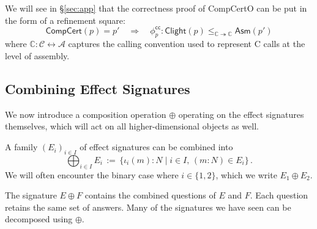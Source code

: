 \documentclass[acmsmall,screen,review,nonacm]{acmart}
\newcommand{\kw}[1]{\ensuremath{ \mathsf{#1} }}
\begin{document}
\begin{example} %
\label{ex:bq-proof}
We will see in \S\ref{sec:app}
that the correctness proof of CompCertO
can be put in the form of a refinement square:
\[
  \kw{CompCert}(p) = p'
  \quad \Longrightarrow \quad
    \phi^\kw{cc}_p :
      \kw{Clight}(p) \le_{\mathbb{C} \twoheadrightarrow \mathbb{C}} \kw{Asm}(p')
\]
where %
$\mathbb{C} : \mathcal{C} \leftrightarrow \mathcal{A}$
captures the calling convention used %
to represent C calls at the level of assembly.
\end{example}



\subsection{Combining Effect Signatures} \label{sec:fcomp} %

We now introduce
a composition operation $\oplus$ operating on the effect signatures themselves,
which will act on all higher-dimensional objects as well.

\begin{definition}
A family $(E_i)_{i \in I}$ of effect signatures can be combined into
\[
  \bigoplus_{i \in I} E_i \, := \,
    \{ \iota_i(m) \mathbin: N \mid i \in I,\, (m \mathbin: N) \in E_i \}
  \,.
\]
We will often encounter the binary case where $i \in \{1, 2\}$,
which we write $E_1 \oplus E_2$.
\end{definition}

The signature $E \oplus F$ contains the combined questions of $E$ and $F$.
Each question retains the same set of answers.
Many of the signatures we have seen can be decomposed using $\oplus$.
\end{document}
